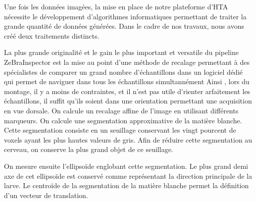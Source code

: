 \documentclass[\main/main.tex]{subfiles}
\begin{document}
%
Une fois les données imagées, la mise en place de notre plateforme d'HTA
nécessite le développement d'algorithmes informatiques permettant de traiter
la grande quantité de données générées.
%
Dans le cadre de nos travaux, nous avons créé deux traitements distincts.

\label{sec:lempereur_bio:recalage}
%
La plus grande originalité et le gain le plus important et versatile du pipeline ZeBraInspector est la mise au point d'une méthode de recalage
permettant à des spécialistes de comparer un grand nombre d'échantillons dans un logiciel dédié qui permet de naviguer dans tous les échantillons simultannément
%
Ainsi , lors du montage, il y a moins de contraintes, et il n'est pas utile d'rienter arfaitement les échantillons, il suffit qu'ils soient dans une orientation permettant une acquisition en vue dorsale.  
%
On calcule un recalage affine de l'image en utilisant différents marqueurs.
%
On calcule une segmentation approximative de la matière blanche.
%
Cette segmentation consiste en un seuillage conservant les vingt pourcent de voxels ayant les plus hautes valeurs de gris.
%
Afin de réduire cette segmentation au cerveau, on conserve la plus grand objet de ce seuillage.
%

%
On mesure ensuite l'ellipsoïde englobant cette segmentation.
%
Le plus grand demi axe de cet ellipsoïde est conservé comme représentant la direction principale de la larve.
%
Le centroïde de la segmentation de la matière blanche permet la définition d'un vecteur de translation.
\end{document}
